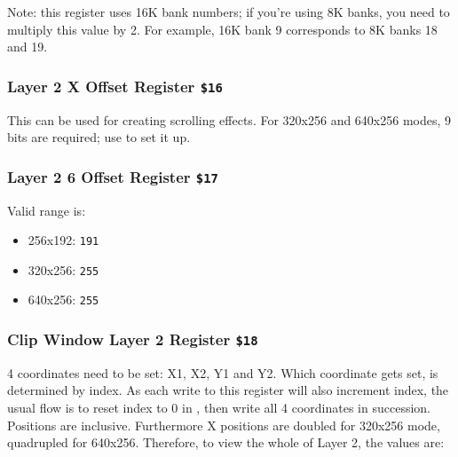 \documentclass[12pt,twoside,openright,a4paper]{book}
\begin{document}
Note: this register uses 16K bank numbers; if you're using 8K banks, you need to multiply this value by 2. For example, 16K bank 9 corresponds to 8K banks 18 and 19.


\subsubsection{Layer 2 X Offset Register {\tt \$16}}

\begin{NextPort}
\end{NextPort}

This can be used for creating scrolling effects. For 320x256 and 640x256 modes, 9 bits are required; use  to set it up.


\subsubsection{Layer 2 6 Offset Register {\tt \$17}}

\begin{NextPort}
\end{NextPort}

Valid range is:

\begin{itemize}[topsep=1pt,itemsep=1pt]
	\item 256x192: {\tt 191}
	\item 320x256: {\tt 255}
	\item 640x256: {\tt 255}
\end{itemize}


\subsubsection{Clip Window Layer 2 Register {\tt \$18}}

\begin{NextPort}
\end{NextPort}

4 coordinates need to be set: X1, X2, Y1 and Y2. Which coordinate gets set, is determined by index. As each write to this register will also increment index, the usual flow is to reset index to 0 in , then write all 4 coordinates in succession. Positions are inclusive. Furthermore X positions are doubled for 320x256 mode, quadrupled for 640x256. Therefore, to view the whole of Layer 2, the values are:
\end{document}
